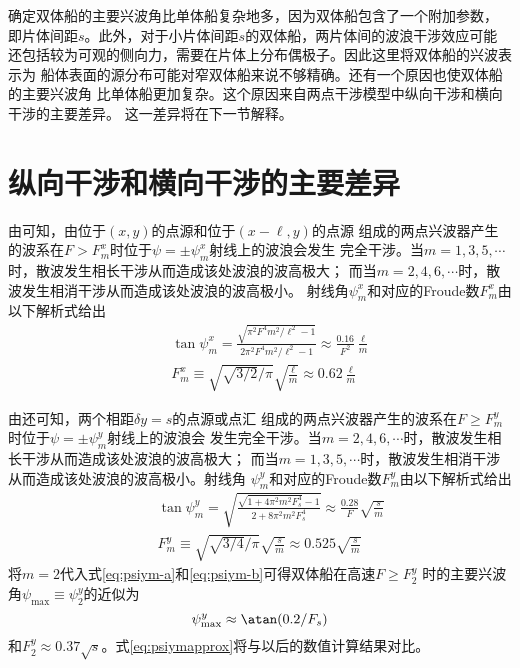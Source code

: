 确定双体船的主要兴波角比单体船复杂地多，因为双体船包含了一个附加参数，
即片体间距$s$。此外，对于小片体间距$s$的双体船，两片体间的波浪干涉效应可能
还包括较为可观的侧向力，需要在片体上分布偶极子。因此这里将双体船的兴波表示为
船体表面的源分布可能对窄双体船来说不够精确。还有一个原因也使双体船的主要兴波角
比单体船更加复杂。这个原因来自两点干涉模型中纵向干涉和横向干涉的主要差异。
这一差异将在下一节解释。

\section{纵向干涉和横向干涉的主要差异}
\label{sec:xyintrfmajordiff}
由\parencite{Noblesse2014Why}可知，由位于$(x,y)$的点源和位于$(x-\ell,y)$的点源
组成的两点兴波器产生的波系在$F>F_m^x$时位于$\psi=\pm\psi_m^x$射线上的波浪会发生
完全干涉。当$m=1,3,5,\cdots$时，散波发生相长干涉从而造成该处波浪的波高极大；
而当$m=2,4,6,\cdots$时，散波发生相消干涉从而造成该处波浪的波高极小。
射线角$\psi_m^x$和对应的Froude数$F_m^x$由以下解析式给出
\begin{subequations}\label{eq:psixm}
  \begin{eqnarray}
    &&\tan\psi_m^x=\frac{\sqrt{\pi^2F^4m^2/\ell^2-1}}{2\pi^2F^4m^2/\ell^2-1}
    \approx\frac{0.16}{F^2}\frac{\ell}{m} \label{eq:psixm-a}\\
    &&F_m^x\equiv\sqrt{\sqrt{3/2}/\pi}\sqrt{\frac{\ell}{m}}\approx
    0.62\frac{\ell}{m} \label{eq:psixm-b}
  \end{eqnarray}
\end{subequations}

由\parencite{Noblesse2014Why}还可知，两个相距$\delta y=s$的点源或点汇
组成的两点兴波器产生的波系在$F\ge F_m^y$时位于$\psi=\pm\psi_m^y$射线上的波浪会
发生完全干涉。当$m=2,4,6,\cdots$时，散波发生相长干涉从而造成该处波浪的波高极大；
而当$m=1,3,5,\cdots$时，散波发生相消干涉从而造成该处波浪的波高极小。射线角
$\psi_m^y$和对应的Froude数$F_m^y$由以下解析式给出
\begin{subequations}\label{eq:psiym}
  \begin{eqnarray}
    &&\tan\psi_m^y=\sqrt{\frac{\sqrt{1+4\pi^2m^2F_s^4}-1}{2+8\pi^2m^2F_s^4}}
    \approx\frac{0.28}{F}\sqrt{\frac{s}{m}} \label{eq:psiym-a}\\
    && F_m^y\equiv\sqrt{\sqrt{3/4}/\pi}\sqrt{\frac{s}{m}}
    \approx0.525\sqrt{\frac{s}{m}} \label{eq:psiym-b}
  \end{eqnarray}
\end{subequations}
将$m=2$代入式\eqref{eq:psiym-a}和\eqref{eq:psiym-b}可得双体船在高速$F\ge F_2^y$
时的主要兴波角$\psi_{\max}\equiv\psi_2^y$的近似为
\begin{equation}
  \psi_{\max}^y\approx\atan(0.2/F_s)
  \label{eq:psiymapprox}
\end{equation}
和$F_2^y\approx0.37\sqrt{s}$。式\eqref{eq:psiymapprox}将与以后的数值计算结果对比。

